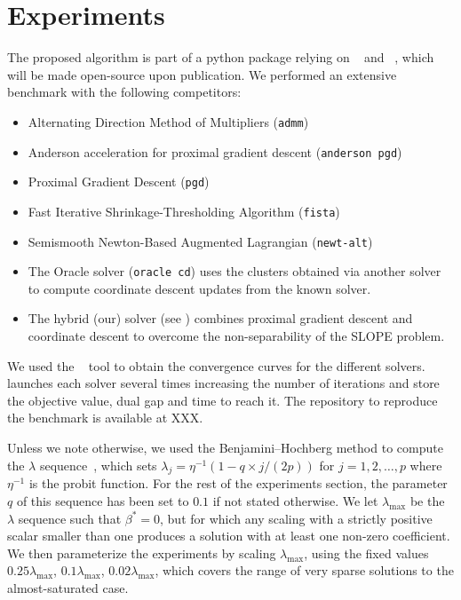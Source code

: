 \section{Experiments}\label{sec:experiments}

The proposed algorithm is part of a python package relying on ~\parencite{harris2020} and ~\parencite{lam2015}, which will
be made open-source upon publication. 
We performed an extensive benchmark with the following competitors:
\begin{itemize}[noitemsep]
  \item Alternating Direction Method of Multipliers (\texttt{admm})~\parencite{boyd2010}
  \item Anderson acceleration for proximal gradient descent (\texttt{anderson pgd})~\parencite{zhang2020}
  \item Proximal Gradient Descent (\texttt{pgd})~\parencite{combettes2005}
  \item Fast Iterative Shrinkage-Thresholding Algorithm (\texttt{fista})~\parencite{beck2009}
  \item Semismooth Newton-Based Augmented Lagrangian (\texttt{newt-alt})~\parencite{Ziyan2019}
  \item The Oracle solver (\texttt{oracle cd}) uses the clusters obtained via another
        solver to compute coordinate descent updates from the known solver.
  \item The hybrid (our) solver (see ) combines proximal gradient descent
        and coordinate descent to overcome the non-separability of the SLOPE problem.
\end{itemize}

We used the ~\parencite{moreau2022benchopt} tool to obtain the convergence curves for the different solvers.
 launches each solver several times increasing the number of iterations and store the objective value, dual gap and time to reach it.
The repository to reproduce the benchmark is available at XXX.

Unless we note otherwise, we used the Benjamini--Hochberg method to compute the \(\lambda\) sequence~\parencite{bogdan2015},
which sets $\lambda_j = \eta^{-1}(1 - q\times j / (2p))$ for $j=1, 2, \hdots, p$ where $\eta^{-1}$ is the probit function. 
For the rest of the experiments section, the parameter $q$ of this sequence has been set to $0.1$ if not stated otherwise.
We let \(\lambda_\text{max}\) be the \(\lambda\) sequence such that \(\beta^* = 0\), but for which any scaling with a strictly positive scalar smaller than one produces a solution with at least one non-zero coefficient.
We then parameterize the experiments by scaling \(\lambda_\text{max}\), using the fixed values \(0.25 \lambda_\text{max}\), \(0.1 \lambda_\text{max}\), \(0.02 \lambda_\text{max}\), which covers the range of very sparse solutions to the almost-saturated case.

